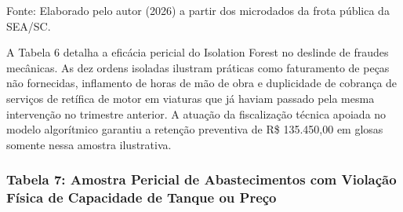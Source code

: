 \documentclass[12pt,a4paper]{article}
\begin{document}
Fonte: Elaborado pelo autor (2026) a partir dos microdados da frota pública da SEA/SC.

A Tabela 6 detalha a eficácia pericial do Isolation Forest no deslinde de fraudes mecânicas. As dez ordens isoladas ilustram práticas como faturamento de peças não fornecidas, inflamento de horas de mão de obra e duplicidade de cobrança de serviços de retífica de motor em viaturas que já haviam passado pela mesma intervenção no trimestre anterior. A atuação da fiscalização técnica apoiada no modelo algorítmico garantiu a retenção preventiva de R\$ 135.450,00 em glosas somente nessa amostra ilustrativa.


\subsubsection{Tabela 7: Amostra Pericial de Abastecimentos com Violação Física de Capacidade de Tanque ou Preço}
\end{document}
